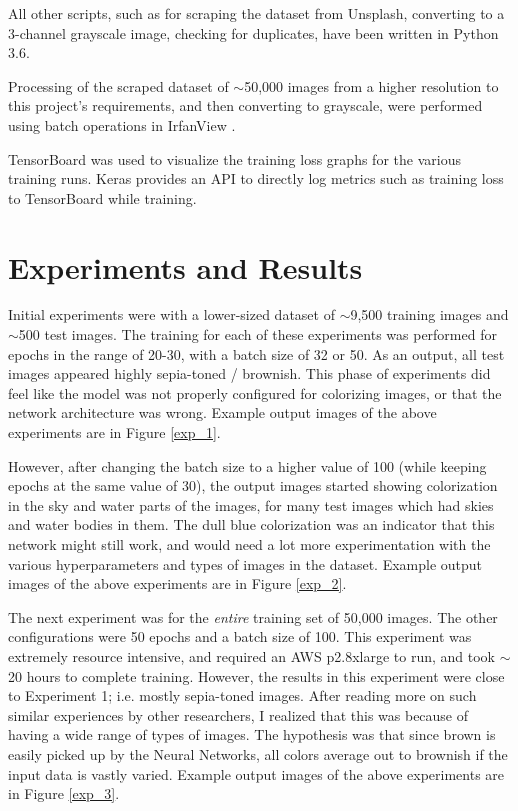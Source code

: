 \documentclass[10pt,twocolumn,letterpaper]{article}
\begin{document}
	All other scripts, such as for scraping the dataset from Unsplash, converting to a 3-channel grayscale image, checking for duplicates, have been written in Python 3.6.

	Processing of the scraped dataset of $\sim$50,000 images from a higher resolution to this project's requirements, and then converting to grayscale, were performed using batch operations in IrfanView \cite{IrfanView}.

	TensorBoard \cite{TensorFlow} was used to visualize the training loss graphs for the various training runs. Keras provides an API to directly log metrics such as training loss to TensorBoard while training.

	\section{Experiments and Results}
	Initial experiments were with a lower-sized dataset of $\sim$9,500 training images and $\sim$500 test images. The training for each of these experiments was performed for epochs in the range of 20-30, with a batch size of 32 or 50. As an output, all test images appeared highly sepia-toned / brownish. This phase of experiments did feel like the model was not properly configured for colorizing images, or that the network architecture was wrong. Example output images of the above experiments are in Figure \ref{exp_1}.

	However, after changing the batch size to a higher value of 100 (while keeping epochs at the same value of 30), the output images started showing colorization in the sky and water parts of the images, for many test images which had skies and water bodies in them. The dull blue colorization was an indicator that this network might still work, and would need a lot more experimentation with the various hyperparameters and types of images in the dataset. Example output images of the above experiments are in Figure \ref{exp_2}.

	The next experiment was for the \textit{entire} training set of 50,000 images. The other configurations were 50 epochs and a batch size of 100. This experiment was extremely resource intensive, and required an AWS p2.8xlarge to run, and took $\sim$20 hours to complete training. However, the results in this experiment were close to Experiment 1; i.e. mostly sepia-toned images. After reading more on such similar experiences by other researchers, I realized that this was because of having a wide range of types of images. The hypothesis was that since brown is easily picked up by the Neural Networks, all colors average out to brownish if the input data is vastly varied. Example output images of the above experiments are in Figure \ref{exp_3}.
\end{document}
